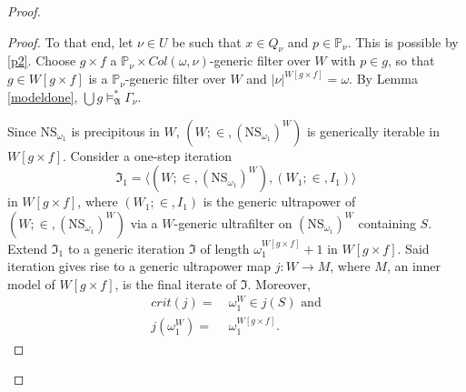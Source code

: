 \documentclass[12pt]{article}
\numberwithin{equation}{section}
\begin{document}
\begin{proof}
\begin{proof}
To that end, let $\nu \in U$ be such that $x \in Q_{\nu}$ and $p \in \mathbb{P}_{\nu}$. This is possible by \ref{p2}. Choose $g \times f$ a $\mathbb{P}_{\nu} \times Col(\omega, \nu)$-generic filter over $W$ with $p \in g$, so that $g \in W[g \times f]$ is a $\mathbb{P}_{\nu}$-generic filter over $W$ and $|\nu|^{W[g \times f]} = \omega$. By Lemma \ref{modeldone}, $\bigcup g \models^*_{\mathfrak{A}} \Gamma_{\nu}$.

Since $\mathrm{NS}_{\omega_1}$ is precipitous in $W$, $(W; \in, (\mathrm{NS}_{\omega_1})^W)$ is generically iterable in $W[g \times f]$. Consider a one-step iteration $$\mathfrak{I}_1 = \langle (W; \in, (\mathrm{NS}_{\omega_1})^W), (W_1; \in, I_1) \rangle$$ in $W[g \times f]$, where $(W_1; \in, I_1)$ is the generic ultrapower of $(W; \in, (\mathrm{NS}_{\omega_1})^W)$ via a $W$-generic ultrafilter on $(\mathrm{NS}_{\omega_1})^W$ containing $S$. Extend $\mathfrak{I}_1$ to a generic iteration $\mathfrak{I}$ of length $\omega_1^{W[g \times f]} + 1$ in $W[g \times f]$. Said iteration gives rise to a generic ultrapower map $j : W \longrightarrow M$, where $M$, an inner model of $W[g \times f]$, is the final iterate of $\mathfrak{I}$. Moreover, 
\begin{align*}
    crit(j) = \ & \omega_1^W \in j(S) \text{ and} \\
    j(\omega_1^W) = \ & \omega_1^{W[g \times f]} \text{.}
\end{align*}


\end{proof}
\end{proof}
\end{document}
